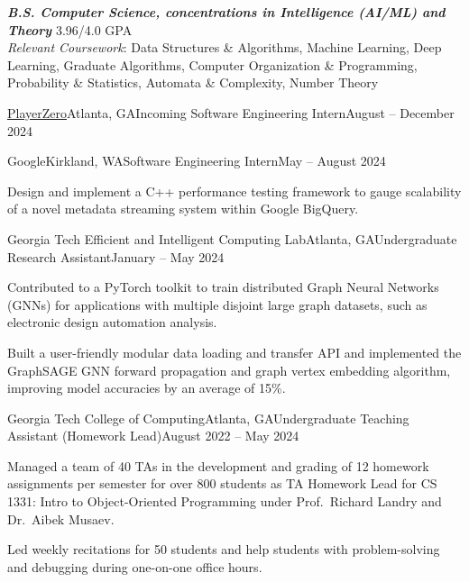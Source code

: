 \documentclass{article}
\begin{document}
\thispagestyle{empty}


\begin{flushleft}


{\textbf{\textit{B.S. Computer Science, concentrations in Intelligence (AI/ML) and Theory}} \hfill 3.96/4.0 GPA \\ \textit{Relevant Coursework}: Data Structures \& Algorithms, Machine Learning, Deep Learning, Graduate Algorithms, Computer Organization \& Programming, Probability \& Statistics, Automata \& Complexity, Number Theory}


    \begin{experiencenolist}{\href{https://www.playerzero.ai/}{PlayerZero}}{Atlanta, GA}{Incoming Software Engineering Intern}{August -- December 2024}
    \end{experiencenolist}

    \begin{experience}{Google}{Kirkland, WA}{Software Engineering Intern}{May -- August 2024}
        \item Design and implement a C++ performance testing framework to gauge scalability of a novel metadata streaming system within Google BigQuery.
    \end{experience}

    \begin{experience}{Georgia Tech Efficient and Intelligent Computing Lab}{Atlanta, GA}{Undergraduate Research Assistant}{January -- May 2024}
        \item Contributed to a PyTorch toolkit to train distributed Graph Neural Networks (GNNs) for applications with multiple disjoint large graph datasets, such as electronic design automation analysis.
        \item Built a user-friendly modular data loading and transfer API and implemented the GraphSAGE GNN forward propagation and graph vertex embedding algorithm, improving model accuracies by an average of 15\%.
    \end{experience}

    \begin{experience}{Georgia Tech College of Computing}{Atlanta, GA}{Undergraduate Teaching Assistant (Homework Lead)}{August 2022 -- May 2024}
        \item Managed a team of 40 TAs in the development and grading of 12 homework assignments per semester for over 800 students as TA Homework Lead for CS 1331: Intro to Object-Oriented Programming under Prof.~Richard Landry and Dr.~Aibek Musaev.
        \item Led weekly recitations for 50 students and help students with problem-solving and debugging during one-on-one office hours.
    \end{experience}


\end{flushleft}
\end{document}
